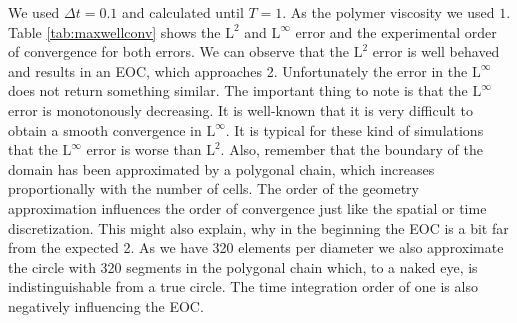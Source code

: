 \documentclass[12pt,a4paper,twoside, open=right]{scrreprt}
\theoremstyle{definition}
\theoremstyle{plain}
\begin{document}
We used $\Delta t = 0.1$ and calculated until $T=1$. As the polymer viscosity we used $1$. Table \ref{tab:maxwellconv} shows the $\mathrm{L}^2$ and $\mathrm{L}^\infty$ error and the experimental order of convergence for both errors. We can observe that the $\mathrm{L}^2$ error is well behaved and results in an EOC, which approaches 2. Unfortunately the error in the $\mathrm{L}^\infty$ does not return something similar. The important thing to note is that the $\mathrm{L}^\infty$ error is monotonously decreasing. It is well-known that it is very difficult to obtain a smooth convergence in $\mathrm{L}^\infty$. It is typical for these kind of simulations that the $\mathrm{L}^\infty$ error is worse than $\mathrm{L}^2$. Also, remember that the boundary of the domain has been approximated by a polygonal chain, which increases proportionally with the number of cells. The order of the geometry approximation influences the order of convergence just like the spatial or time discretization. This might also explain, why in the beginning the EOC is a bit far from the expected 2. As we have 320 elements per diameter we also approximate the circle with 320 segments in the polygonal chain which, to a naked eye, is indistinguishable from a true circle. The time integration order of one is also negatively influencing the EOC. 
\end{document}
